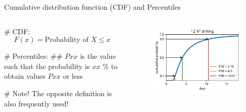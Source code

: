 \documentclass[12pt, aspectratio=149]{beamer}
\theoremstyle{plain}
\begin{document}
\begin{frame}[fragile]{Cumulative distribution function (CDF) and Percentiles}
	\begin{columns}
		\begin{column}{0.5\textwidth}
			\begin{easylist}[itemize]
				# CDF:
				\begin{equation*}
					F(x) = \text{Probability of $X \leq x$}
				\end{equation*}
			
				# Percentiles:
				##  $Pxx$ is the value such that the probability is $xx$ \% to obtain values $Pxx$ or less
	
				# Note! The opposite definition is also frequently used!
			\end{easylist}
		\end{column}
	
		\begin{column}{0.5\textwidth}
			\begin{figure}
				\centering
				\includegraphics[width=0.99\linewidth]{figures/lognorm_cdf}
			\end{figure}
		\end{column}
	\end{columns}
	\end{frame}
\end{document}
